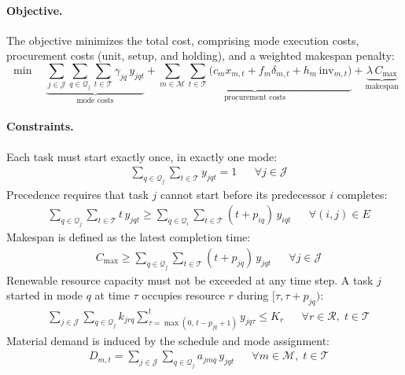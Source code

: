 \documentclass[11pt]{article}
\newcommand{\calJ}{\mathcal{J}}
\newcommand{\calM}{\mathcal{M}}
\newcommand{\calR}{\mathcal{R}}
\newcommand{\calQ}{\mathcal{Q}}
\newcommand{\calT}{\mathcal{T}}
\begin{document}
\paragraph{Objective.}
The objective minimizes the total cost, comprising mode execution costs, procurement costs (unit, setup, and holding), and a weighted makespan penalty:
\begin{equation}\label{eq:mip-obj}
    \min \quad \underbrace{\sum_{j \in \calJ} \sum_{q \in \calQ_j} \sum_{t \in \calT} \gamma_{jq} \, y_{jqt}}_{\text{mode costs}}
    + \underbrace{\sum_{m \in \calM} \sum_{t \in \calT} \bigl( c_m x_{m,t} + f_m \delta_{m,t} + h_m \, \mathrm{inv}_{m,t} \bigr)}_{\text{procurement costs}}
    + \underbrace{\lambda \, C_{\max}}_{\text{makespan}}
\end{equation}

\paragraph{Constraints.}
Each task must start exactly once, in exactly one mode:
\begin{align}
    & \sum_{q \in \calQ_j} \sum_{t \in \calT} y_{jqt} = 1 && \forall j \in \calJ \label{eq:assign}
\end{align}
Precedence requires that task $j$ cannot start before its predecessor $i$ completes:
\begin{align}
    & \sum_{q \in \calQ_j} \sum_{t \in \calT} t \, y_{jqt} \geq \sum_{q \in \calQ_i} \sum_{t \in \calT} (t + p_{iq}) \, y_{iqt} && \forall (i,j) \in E \label{eq:prec}
\end{align}
Makespan is defined as the latest completion time:
\begin{align}
    & C_{\max} \geq \sum_{q \in \calQ_j} \sum_{t \in \calT} (t + p_{jq}) \, y_{jqt} && \forall j \in \calJ \label{eq:cmax}
\end{align}
Renewable resource capacity must not be exceeded at any time step.
A task $j$ started in mode $q$ at time $\tau$ occupies resource $r$ during $[\tau, \tau + p_{jq})$:
\begin{align}
    & \sum_{j \in \calJ} \sum_{q \in \calQ_j} k_{jrq} \sum_{\tau = \max(0,\, t - p_{jq} + 1)}^{t} y_{jq\tau} \leq K_r && \forall r \in \calR, \; t \in \calT \label{eq:res}
\end{align}
Material demand is induced by the schedule and mode assignment:
\begin{align}
    & D_{m,t} = \sum_{j \in \calJ} \sum_{q \in \calQ_j} a_{jmq} \, y_{jqt} && \forall m \in \calM, \; t \in \calT \label{eq:demand}
\end{align}
\end{document}
